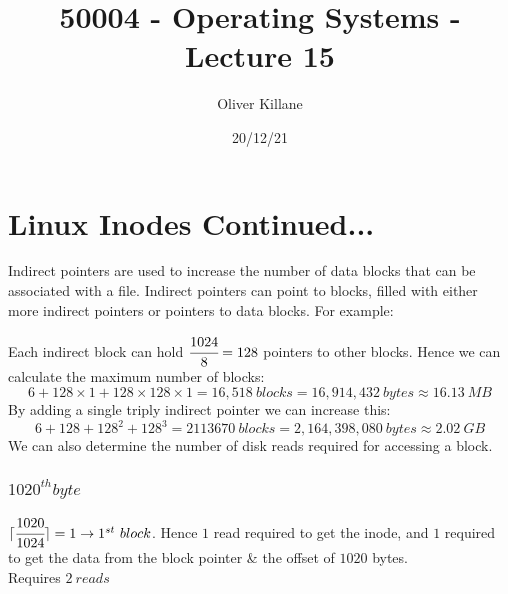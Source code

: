 \documentclass{report}
\title{50004 - Operating Systems - Lecture 15}
\author{Oliver Killane}
\date{20/12/21}
\begin{document}
\maketitle
{}

\section*{Linux Inodes Continued...}
Indirect pointers are used to increase the number of data blocks that can be associated with a file. Indirect pointers can point to blocks, filled with either more indirect pointers or pointers to data blocks.
For example:
\\ 

Each indirect block can hold $\cfrac{1024}{8} = 128$ pointers to other blocks. Hence we can calculate the  maximum number of blocks:
\[6 + 128 \times 1 + 128 \times 128 \times 1 = 16,518 \ blocks = 16,914,432 \ bytes \approx 16.13 \ MB\]
By adding a single triply indirect pointer we can increase this:
\[6 + 128 + 128^2 + 128^3 = 2113670 \ blocks = 2,164,398,080 \ bytes \approx 2.02 \ GB\]
We can also determine the number of disk reads required for accessing a block.
\\ 
\subsubsection*{$1020^{th} byte$}
$\lceil \cfrac{1020}{1024} \rceil = 1  \to 1^{st} \ block$. Hence $1$ read required to get the inode, and $1$ required to get the data from the block pointer \& the offset of $1020$ bytes.
\\ Requires \textbf{$2 \ reads$}
\end{document}
